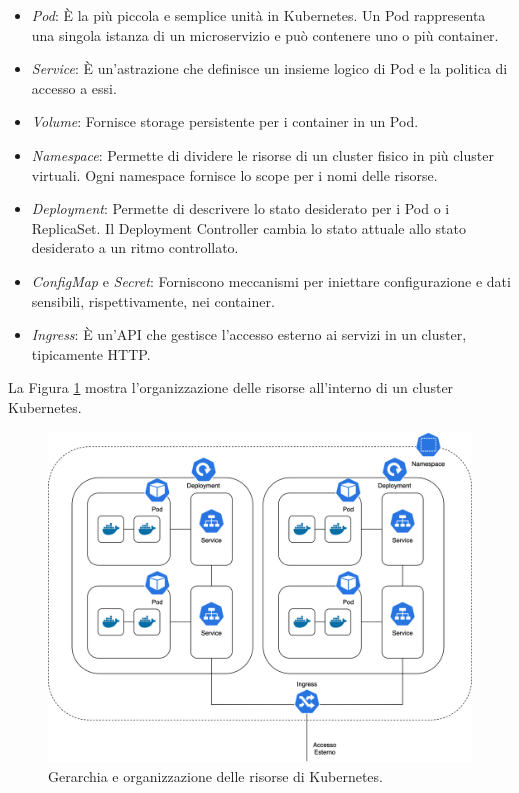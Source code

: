 \begin{itemize}
\item \textit{Pod}: È la più piccola e semplice unità in Kubernetes. Un Pod rappresenta una singola istanza di un microservizio e può contenere uno o più container.
\item \textit{Service}: È un'astrazione che definisce un insieme logico di Pod e la politica di accesso a essi.
\item \textit{Volume}: Fornisce storage persistente per i container in un Pod.
\item \textit{Namespace}: Permette di dividere le risorse di un cluster fisico in più cluster virtuali. Ogni namespace fornisce lo scope per i nomi delle risorse.
\item \textit{Deployment}: Permette di descrivere lo stato desiderato per i Pod o i ReplicaSet. Il Deployment Controller cambia lo stato attuale allo stato desiderato a un ritmo controllato.
\item \textit{ConfigMap} e \textit{Secret}: Forniscono meccanismi per iniettare configurazione e dati sensibili, rispettivamente, nei container.
\item \textit{Ingress}: È un'API che gestisce l'accesso esterno ai servizi in un cluster, tipicamente HTTP.
\end{itemize}
La Figura \ref{fig:kube_objects} mostra l'organizzazione delle risorse all'interno di un cluster Kubernetes.
\begin{figure}[h]
    \centering
    \includegraphics[width=1\linewidth]{immagini/capitolo2/kube_objects.png}
    \caption{Gerarchia e organizzazione delle risorse di Kubernetes.}
    \label{fig:kube_objects}
\end{figure}


